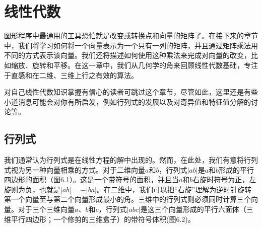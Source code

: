 \chapter{线性代数}




图形程序中最通用的工具恐怕就是改变或转换点和向量的矩阵了。在接下来的章节中，我们将学习如何将一个向量表示为一个只有一列的矩阵，并且通过矩阵乘法用不同的方式表示该向量。我们还将描述如何使用这种乘法来完成对向量的改变，比如缩放、旋转和平移。在这一章中，我们从几何学的角来回顾线性代数基础，专注于直感和在二维、三维上行之有效的算法。

对自己线性代数知识掌握有信心的读者可跳过这个章节，尽管如此，这里还是有些小道消息可能会对你有所启发，例如行列式的发展以及对奇异值和特征值分解的讨论等。

\section{行列式}



我们通常认为行列式是在线性方程的解中出现的。然而，在此处，我们有意将行列式视为另一种向量相乘的方式。对于二维向量$a$和$b$，行列式$|ab|$是$a$和$b$形成的平行四边形的面积（图6.1）。这是一个带符号的面积，并且当$a$和$b$右旋时符号为正，左旋则为负，也就是$|ab| = -|ba|$。在二维中，我们可以把“右旋”理解为逆时针旋转第一个向量至与第二个向量形成最小的角。三维中的行列式则必须同时计算三个向量。对于三个三维向量$a$、$b$和$c$，行列式$|abc|$是这三个向量形成的平行六面体（三维平行四边形；一个修剪的三维盒子）的带符号体积(图6.2)。


